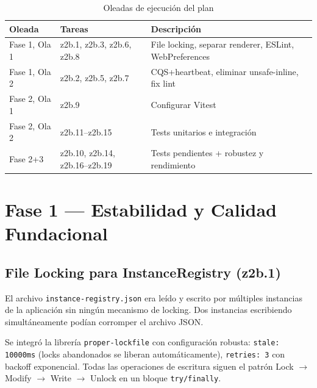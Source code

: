 \documentclass[12pt,a4paper]{article}
\begin{document}
\begin{table}[H]
\centering
\renewcommand{\arraystretch}{1.3}
\begin{tabularx}{\textwidth}{l l X}
\toprule
\textbf{Oleada} & \textbf{Tareas} & \textbf{Descripci\'on} \\
\midrule
Fase 1, Ola 1 & z2b.1, z2b.3, z2b.6, z2b.8 & File locking, separar renderer, ESLint, WebPreferences \\
Fase 1, Ola 2 & z2b.2, z2b.5, z2b.7 & CQS+heartbeat, eliminar unsafe-inline, fix lint \\
Fase 2, Ola 1 & z2b.9 & Configurar Vitest \\
Fase 2, Ola 2 & z2b.11--z2b.15 & Tests unitarios e integraci\'on \\
Fase 2+3 & z2b.10, z2b.14, z2b.16--z2b.19 & Tests pendientes + robustez y rendimiento \\
\bottomrule
\end{tabularx}
\caption{Oleadas de ejecuci\'on del plan}
\end{table}

\section{Fase 1 --- Estabilidad y Calidad Fundacional}

\subsection{File Locking para InstanceRegistry (z2b.1)}

\begin{findingbox}
El archivo \texttt{instance-registry.json} era le\'ido y escrito por m\'ultiples instancias de la aplicaci\'on sin ning\'un mecanismo de locking. Dos instancias escribiendo simult\'aneamente pod\'ian corromper el archivo JSON.
\end{findingbox}

\begin{fixbox}
Se integr\'o la librer\'ia \texttt{proper-lockfile} con configuraci\'on robusta: \texttt{stale: 10000ms} (locks abandonados se liberan autom\'aticamente), \texttt{retries: 3} con backoff exponencial. Todas las operaciones de escritura siguen el patr\'on Lock $\rightarrow$ Modify $\rightarrow$ Write $\rightarrow$ Unlock en un bloque \texttt{try/finally}.
\end{fixbox}
\end{document}
